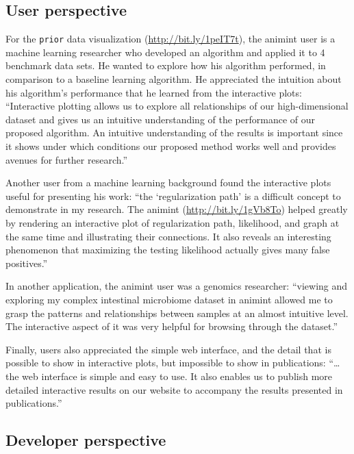 \documentclass[12pt,]{article}
\theoremstyle{definition}
\theoremstyle{definition}
\theoremstyle{remark}
\begin{document}
\subsection{User perspective}\label{user-perspective}

For the \texttt{prior} data visualization (\url{http://bit.ly/1peIT7t}),
the animint user is a machine learning researcher who developed an
algorithm and applied it to 4 benchmark data sets. He wanted to explore
how his algorithm performed, in comparison to a baseline learning
algorithm. He appreciated the intuition about his algorithm's
performance that he learned from the interactive plots: ``Interactive
plotting allows us to explore all relationships of our high-dimensional
dataset and gives us an intuitive understanding of the performance of
our proposed algorithm. An intuitive understanding of the results is
important since it shows under which conditions our proposed method
works well and provides avenues for further research.''

Another user from a machine learning background found the interactive
plots useful for presenting his work: ``the `regularization path' is a
difficult concept to demonstrate in my research. The animint
(\url{http://bit.ly/1gVb8To}) helped greatly by rendering an interactive
plot of regularization path, likelihood, and graph at the same time and
illustrating their connections. It also reveals an interesting
phenomenon that maximizing the testing likelihood actually gives many
false positives.''

In another application, the animint user was a genomics researcher:
``viewing and exploring my complex intestinal microbiome dataset in
animint allowed me to grasp the patterns and relationships between
samples at an almost intuitive level. The interactive aspect of it was
very helpful for browsing through the dataset.''

Finally, users also appreciated the simple web interface, and the detail
that is possible to show in interactive plots, but impossible to show in
publications: ``\ldots{} the web interface is simple and easy to use. It
also enables us to publish more detailed interactive results on our
website to accompany the results presented in publications.''

\subsection{Developer perspective}\label{developer-perspective}
\end{document}
